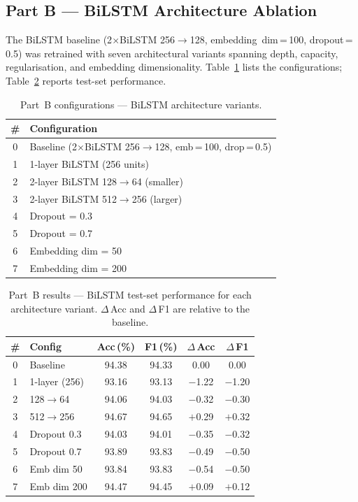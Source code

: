 \subsection{Part B --- BiLSTM Architecture Ablation}

The BiLSTM baseline (2$\times$BiLSTM 256$\rightarrow$128, embedding~dim\,=\,100, dropout\,=\,0.5) was retrained with seven architectural variants spanning depth, capacity, regularisation, and embedding dimensionality. Table~\ref{tab:ablation_configs_b} lists the configurations; Table~\ref{tab:ablation_results_b} reports test-set performance.

\begin{table}[!htb]
\centering
\caption{Part~B configurations --- BiLSTM architecture variants.}
\label{tab:ablation_configs_b}
\small
\begin{tabular}{@{}cl@{}}
\toprule
\textbf{\#} & \textbf{Configuration} \\
\midrule
0 & Baseline (2$\times$BiLSTM 256$\rightarrow$128, emb\,=\,100, drop\,=\,0.5) \\
1 & 1-layer BiLSTM (256 units) \\
2 & 2-layer BiLSTM 128$\rightarrow$64 (smaller) \\
3 & 2-layer BiLSTM 512$\rightarrow$256 (larger) \\
4 & Dropout = 0.3 \\
5 & Dropout = 0.7 \\
6 & Embedding dim = 50 \\
7 & Embedding dim = 200 \\
\bottomrule
\end{tabular}
\end{table}

\begin{table}[!htb]
\centering
\caption{Part~B results --- BiLSTM test-set performance for each architecture variant. $\Delta$\,Acc and $\Delta$\,F1 are relative to the baseline.}
\label{tab:ablation_results_b}
\small
\setlength{\tabcolsep}{3pt}
\begin{tabular}{@{}clcccc@{}}
\toprule
\textbf{\#} & \textbf{Config} & \textbf{Acc\,(\%)} & \textbf{F1\,(\%)} & \textbf{$\Delta$\,Acc} & \textbf{$\Delta$\,F1} \\
\midrule
0 & Baseline            & 94.38 & 94.33 & 0.00   & 0.00   \\
1 & 1-layer (256)       & 93.16 & 93.13 & $-$1.22 & $-$1.20 \\
2 & 128$\rightarrow$64  & 94.06 & 94.03 & $-$0.32 & $-$0.30 \\
3 & 512$\rightarrow$256 & 94.67 & 94.65 & $+$0.29 & $+$0.32 \\
4 & Dropout 0.3         & 94.03 & 94.01 & $-$0.35 & $-$0.32 \\
5 & Dropout 0.7         & 93.89 & 93.83 & $-$0.49 & $-$0.50 \\
6 & Emb dim 50          & 93.84 & 93.83 & $-$0.54 & $-$0.50 \\
7 & Emb dim 200         & 94.47 & 94.45 & $+$0.09 & $+$0.12 \\
\bottomrule
\end{tabular}
\end{table}


